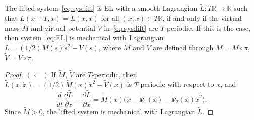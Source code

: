 \begin{proposition}
	\label{prop:EL}
	The lifted system~\eqref{eq:sys:lift} is EL with a smooth Lagrangian
	$\tilde L: T \mathbb{R} \to \mathbb{R}$ such that $\tilde L(x+T,\dot x) = \tilde
	L(x,\dot x)$ for all $(x,\dot{x})\in T\mathbb{R}$, if and only if the virtual
	mass $\tilde{M}$ and virtual potential $\tilde{V}$
	in~\eqref{eq:sys:lift} are $T$-periodic. If this is the case, then
	system~\eqref{eq:EL} is mechanical with Lagrangian $L = (1/2) M(s)
	\dot s^2 - V(s)$, where $M$ and $V$ are defined through $\tilde M = M
	\circ \pi$, $\tilde V = V \circ \pi$.
\end{proposition}
\begin{proof}
	$(\Leftarrow)$ If $\tilde M$, $\tilde V$ are $T$-periodic, then
	$\tilde L(x,\dot x) = (1/2) \tilde M(x) \dot x^2 - \tilde V(x)$ is
	$T$-periodic with respect to $x$, and
	\[
	\frac{d}{dt} \frac{\partial \tilde L}{\partial \dot x} -
	\frac{\partial \tilde L}{\partial x} = \tilde M(x)
	\big(\ddot{x}-\tilde{\Psi}_1(x)-\tilde{\Psi}_2(x)\dot{x}^2\big).
	\]
				Since $\tilde M>0$, the lifted system is mechanical with Lagrangian $\tilde L$.
	

\end{proof}
